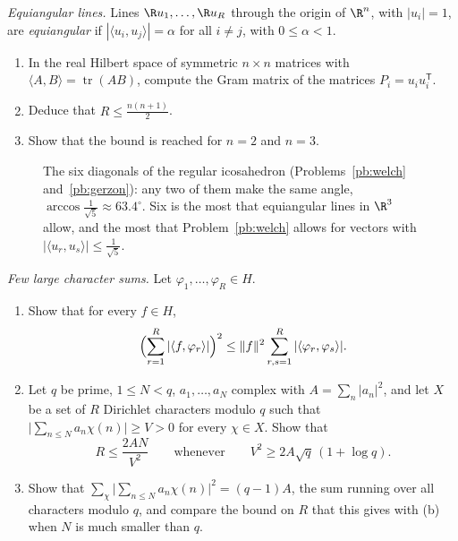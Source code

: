 \begin{exercise}[$\star\star$]\label{pb:gerzon}
\emph{Equiangular lines.} Lines $\R u_1,\dots,\R u_R$ through the origin of $\R^n$, with $|u_i|=1$, are \emph{equiangular} if
$|\langle u_i,u_j\rangle|=\alpha$ for all $i\ne j$, with $0\le\alpha<1$.
\begin{enumerate}[label=(\alph*)]
\item In the real Hilbert space of symmetric $n\times n$ matrices with $\langle A,B\rangle=\operatorname{tr}(AB)$, compute the Gram matrix of the
matrices $P_i=u_iu_i^{\mathsf T}$.
\item Deduce that $R\le\frac{n(n+1)}2$.
\item Show that the bound is reached for $n=2$ and $n=3$.
\end{enumerate}
\end{exercise}

\begin{figure}[ht]
\centering
{}
\caption{The six diagonals of the regular icosahedron (Problems~\ref{pb:welch} and~\ref{pb:gerzon}): any two of them make the same angle,
$\arccos\frac1{\sqrt5}\approx63.4^\circ$. Six is the most that equiangular lines in $\R^3$ allow, and the most that Problem~\ref{pb:welch}
allows for vectors with $|\langle u_r,u_s\rangle|\le\frac1{\sqrt5}$.}\label{fig:icosa}
\end{figure}

\begin{exercise}[$\star\star$]\label{pb:halasz}
\emph{Few large character sums.} Let $\varphi_1,\dots,\varphi_R\in H$.
\begin{enumerate}[label=(\alph*)]
\item Show that for every $f\in H$,
\[
\Bigl(\sum_{r=1}^R|\langle f,\varphi_r\rangle|\Bigr)^2\le\|f\|^2\sum_{r,s=1}^R|\langle\varphi_r,\varphi_s\rangle|.
\]
\item Let $q$ be prime, $1\le N<q$, $a_1,\dots,a_N$ complex with $A=\sum_n|a_n|^2$, and let $X$ be a set of $R$ Dirichlet characters modulo $q$ such
that $\bigl|\sum_{n\le N}a_n\chi(n)\bigr|\ge V>0$ for every $\chi\in X$. Show that
\[
R\le\frac{2AN}{V^2}\qquad\text{whenever}\qquad V^2\ge2A\sqrt q\,(1+\log q).
\]
\item Show that $\sum_\chi\bigl|\sum_{n\le N}a_n\chi(n)\bigr|^2=(q-1)A$, the sum running over all characters modulo $q$, and compare the bound on $R$ that this
gives with (b) when $N$ is much smaller than $q$.
\end{enumerate}
\end{exercise}

